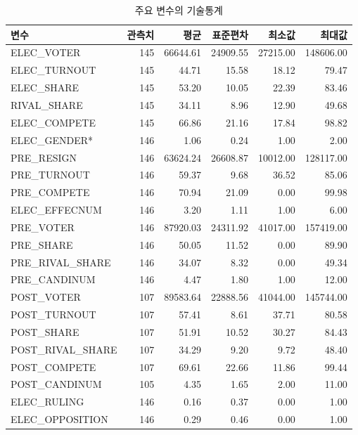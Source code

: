 \documentclass[
  11pt,
  letter]{article}
\begin{document}
\begin{longtable}[t]{l|r|r|r|r|r}
\caption{\label{tab:unnamed-chunk-25}주요 변수의 기술통계}\\
\hline
변수 & 관측치 & 평균 & 표준편차 & 최소값 & 최대값\\
\hline
ELEC\_VOTER & 145 & 66644.61 & 24909.55 & 27215.00 & 148606.00\\
\hline
ELEC\_TURNOUT & 145 & 44.71 & 15.58 & 18.12 & 79.47\\
\hline
ELEC\_SHARE & 145 & 53.20 & 10.05 & 22.39 & 83.46\\
\hline
RIVAL\_SHARE & 145 & 34.11 & 8.96 & 12.90 & 49.68\\
\hline
ELEC\_COMPETE & 145 & 66.86 & 21.16 & 17.84 & 98.82\\
\hline
ELEC\_GENDER* & 146 & 1.06 & 0.24 & 1.00 & 2.00\\
\hline
PRE\_RESIGN & 146 & 63624.24 & 26608.87 & 10012.00 & 128117.00\\
\hline
PRE\_TURNOUT & 146 & 59.37 & 9.68 & 36.52 & 85.06\\
\hline
PRE\_COMPETE & 146 & 70.94 & 21.09 & 0.00 & 99.98\\
\hline
ELEC\_EFFECNUM & 146 & 3.20 & 1.11 & 1.00 & 6.00\\
\hline
PRE\_VOTER & 146 & 87920.03 & 24311.92 & 41017.00 & 157419.00\\
\hline
PRE\_SHARE & 146 & 50.05 & 11.52 & 0.00 & 89.90\\
\hline
PRE\_RIVAL\_SHARE & 146 & 34.07 & 8.32 & 0.00 & 49.34\\
\hline
PRE\_CANDINUM & 146 & 4.47 & 1.80 & 1.00 & 12.00\\
\hline
POST\_VOTER & 107 & 89583.64 & 22888.56 & 41044.00 & 145744.00\\
\hline
POST\_TURNOUT & 107 & 57.41 & 8.61 & 37.71 & 80.58\\
\hline
POST\_SHARE & 107 & 51.91 & 10.52 & 30.27 & 84.43\\
\hline
POST\_RIVAL\_SHARE & 107 & 34.29 & 9.20 & 9.72 & 48.40\\
\hline
POST\_COMPETE & 107 & 69.61 & 22.66 & 11.86 & 99.44\\
\hline
POST\_CANDINUM & 105 & 4.35 & 1.65 & 2.00 & 11.00\\
\hline
ELEC\_RULING & 146 & 0.16 & 0.37 & 0.00 & 1.00\\
\hline
ELEC\_OPPOSITION & 146 & 0.29 & 0.46 & 0.00 & 1.00\\
\hline
\end{longtable}
\end{document}
